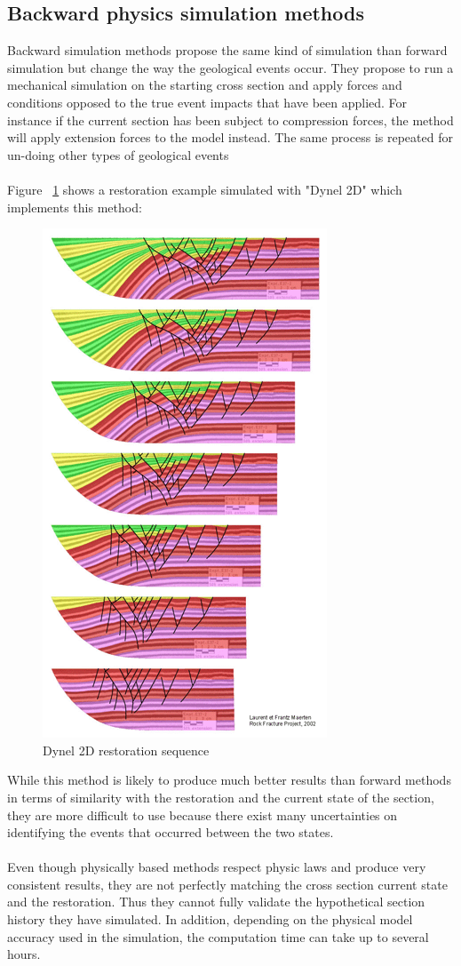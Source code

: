\documentclass[12pt, a4paper]{report} %
\begin{document}
\subsection{Backward physics simulation methods}
Backward simulation methods propose the same kind of simulation than forward simulation but change the way the geological events occur. They propose to run a mechanical simulation on the starting cross section and apply forces and conditions opposed to the true event impacts that have been applied. For instance if the current section has been subject to compression forces, the method will apply extension forces to the model instead. The same process is repeated for un-doing other types of geological events\\\\
 Figure ~\ref{dyn2} shows a restoration example simulated with "Dynel 2D" \cite{Dynel} which implements this method:
 \begin{figure}[H]
	\centering
	\includegraphics[scale=0.6]{dynel2D.png}
	\caption{Dynel 2D restoration sequence}
	\label{dyn2}
\end{figure}
While this method is likely to produce much better results than forward methods in terms of similarity with the restoration and the current state of the section, they are more difficult to use because there exist many uncertainties on identifying the events that occurred between the two states.\\\\
Even though physically based methods respect physic laws and produce very consistent results, they are not perfectly matching the cross section current state and the restoration. Thus they cannot fully validate the hypothetical section history they have simulated. In addition, depending on the physical model accuracy used in the simulation, the computation time can take up to several hours.
\end{document}
